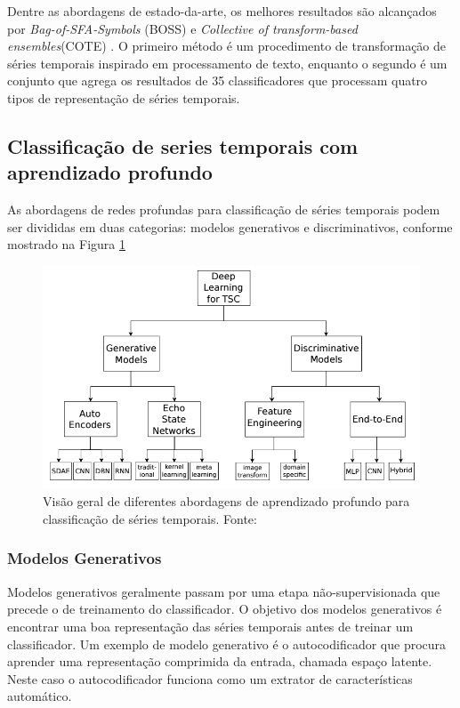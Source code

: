 Dentre as abordagens de estado-da-arte, os melhores resultados são alcançados por \textit{Bag-of-SFA-Symbols} (BOSS)\cite{schafer2015} e \textit{Collective of transform-based ensembles}(COTE) \cite{bagnall2015}. O primeiro método é um procedimento de transformação de séries temporais inspirado em processamento de texto, enquanto o segundo é um conjunto que agrega os resultados de 35 classificadores que processam quatro tipos de representação de séries temporais.

\subsection{Classificação de series temporais com aprendizado profundo}

As abordagens de redes profundas para classificação de séries temporais podem ser divididas em duas categorias\cite{ismail2018}: modelos generativos e discriminativos, conforme mostrado na Figura \ref{fig-dnn-overview} 

\begin{figure}[H]
	\centering
	\includegraphics[scale=0.4]{pasta1_figuras/dnn-tsc.png}
	\caption {Visão geral de diferentes abordagens de aprendizado profundo para classificação de séries temporais. Fonte: \cite{ismail2018}}
	\label{fig-dnn-overview}
\end{figure}

\subsubsection{Modelos Generativos}
Modelos generativos geralmente passam por uma etapa não-supervisionada que precede o de treinamento do classificador. O objetivo dos modelos generativos é encontrar uma boa representação das séries temporais antes de treinar um classificador. Um exemplo de modelo generativo é o autocodificador que procura aprender uma representação comprimida da entrada, chamada espaço latente. Neste caso o autocodificador funciona como um extrator de características automático.

